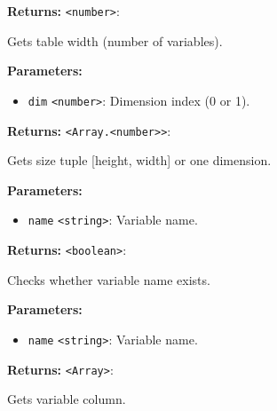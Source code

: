 \documentclass[12pt,a4paper]{article}
\begin{document}
\vspace{5mm}
\noindent {}


\noindent \textbf{Returns:} \texttt{<number>}:

\noindent Gets table width (number of variables).

\vspace{5mm}
\noindent {}


\noindent \textbf{Parameters:}
\begin{itemize}
  \item \texttt{dim} \texttt{<number>}: Dimension index (0 or 1).
\end{itemize}

\noindent \textbf{Returns:} \texttt{<Array.<number>>}:

\noindent Gets size tuple [height, width] or one dimension.

\vspace{5mm}
\noindent {}


\noindent \textbf{Parameters:}
\begin{itemize}
  \item \texttt{name} \texttt{<string>}: Variable name.
\end{itemize}

\noindent \textbf{Returns:} \texttt{<boolean>}:

\noindent Checks whether variable name exists.

\vspace{5mm}
\noindent {}


\noindent \textbf{Parameters:}
\begin{itemize}
  \item \texttt{name} \texttt{<string>}: Variable name.
\end{itemize}

\noindent \textbf{Returns:} \texttt{<Array>}:

\noindent Gets variable column.
\end{document}
